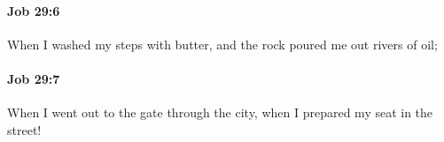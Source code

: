 		\paragraph{Job 29:6} %
			\label{JOB-29-6}

			When I washed my steps with butter, and the rock poured me out rivers of oil;


		\paragraph{Job 29:7} %
			\label{JOB-29-7}

			When I went out to the gate through the city, when I prepared my seat in the street!


